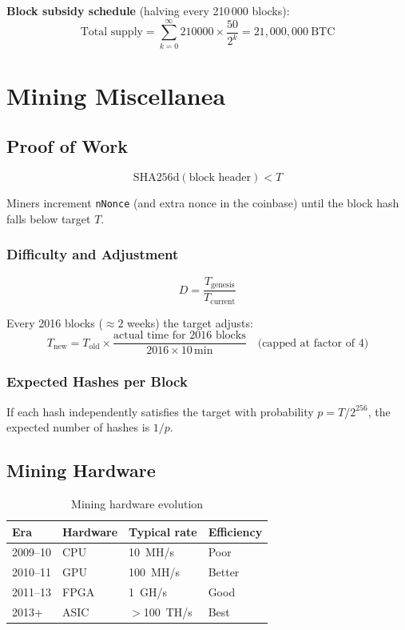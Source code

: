 \documentclass[12pt,a4paper,openany]{book}
\theoremstyle{definition}
\theoremstyle{plain}
\theoremstyle{remark}
\begin{document}
\textbf{Block subsidy schedule} (halving every 210\,000 blocks):
\[
  \text{Total supply} = \sum_{k=0}^{\infty}210000\times\frac{50}{2^k}
  = 21{,}000{,}000\ \text{BTC}
\]


\chapter{Mining Miscellanea}
\label{chap:mining}

\section{Proof of Work}

\begin{equation}
  \boxed{\mathrm{SHA256d}(\text{block header}) < T}
\end{equation}

Miners increment \texttt{nNonce} (and extra nonce in the coinbase) until
the block hash falls below target $T$.

\subsection{Difficulty and Adjustment}

\[
  D = \frac{T_{\text{genesis}}}{T_{\text{current}}}
\]

Every 2016 blocks ($\approx 2$ weeks) the target adjusts:
\[
  T_{\text{new}} = T_{\text{old}}
  \times\frac{\text{actual time for 2016 blocks}}{2016\times10\,\text{min}}
  \quad\text{(capped at factor of 4)}
\]

\subsection{Expected Hashes per Block}

If each hash independently satisfies the target with probability
$p=T/2^{256}$, the expected number of hashes is $1/p$.

\section{Mining Hardware}

\begin{table}[h]
\centering
\caption{Mining hardware evolution}
\begin{tabular}{llll}
\toprule
\textbf{Era} & \textbf{Hardware} & \textbf{Typical rate} & \textbf{Efficiency}\\
\midrule
2009--10 & CPU  & 10~MH/s     & Poor \\
2010--11 & GPU  & 100~MH/s    & Better \\
2011--13 & FPGA & 1~GH/s      & Good \\
2013+    & ASIC & $>$100~TH/s & Best \\
\bottomrule
\end{tabular}
\end{table}
\end{document}
